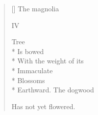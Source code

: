 \begin{verse}[\versewidth]
The magnolia 

 \qquad IV

Tree\\*
Is bowed\\*
With the weight of its\\*
Immaculate\\*
Blossoms\\*
Earthward.                      The dogwood

Has not yet flowered.
\end{verse}

